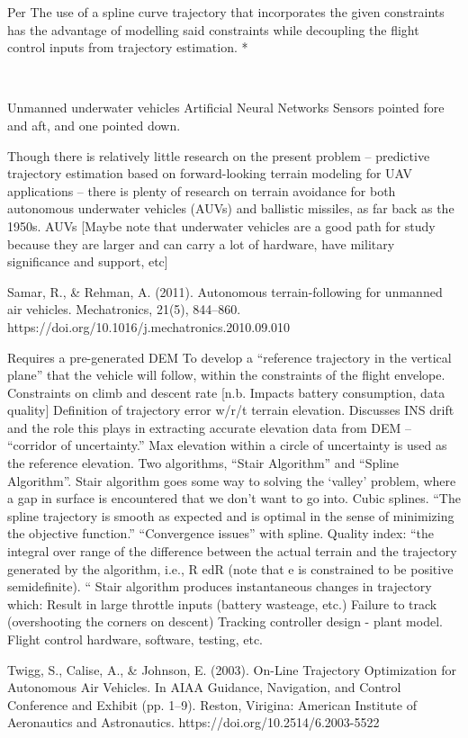 Per The use of a spline curve trajectory that incorporates the given constraints has the advantage of modelling said constraints while decoupling the flight control inputs from trajectory estimation. *


~~~

Unmanned underwater vehicles
Artificial Neural Networks
Sensors pointed fore and aft, and one pointed down.

Though there is relatively little research on the present problem -- predictive trajectory estimation based on forward-looking terrain modeling for UAV applications -- there is plenty of research on terrain avoidance for both autonomous underwater vehicles (AUVs) and ballistic missiles, as far back as the 1950s. 
AUVs
[Maybe note that underwater vehicles are a good path for study because they are larger and can carry a lot of hardware, have military significance and support, etc]

\cite{Samar2011}
Samar, R., \& Rehman, A. (2011). Autonomous terrain-following for unmanned air vehicles. Mechatronics, 21(5), 844–860. https://doi.org/10.1016/j.mechatronics.2010.09.010

Requires a pre-generated DEM
To develop a “reference trajectory in the vertical plane” that the vehicle will follow, within the constraints of the flight envelope.
Constraints on climb and descent rate [n.b. Impacts battery consumption, data quality]
Definition of trajectory error w/r/t terrain elevation.
Discusses INS drift and the role this plays in extracting accurate elevation data from DEM -- “corridor of uncertainty.”
Max elevation within a circle of uncertainty is used as the reference elevation.
Two algorithms, “Stair Algorithm” and “Spline Algorithm”.
Stair algorithm goes some way to solving the ‘valley’ problem, where a gap in surface is encountered that we don’t want to go into.
Cubic splines.
“The spline trajectory is smooth as expected and is optimal in the sense of minimizing the objective function.”
“Convergence issues” with spline.
Quality index: “the integral over range of the difference between the actual terrain and the trajectory generated by the algorithm, i.e., R edR (note that e is constrained to be positive semidefinite). “
Stair algorithm produces instantaneous changes in trajectory which:
Result in large throttle inputs (battery wasteage, etc.)
Failure to track (overshooting the corners on descent)
Tracking controller design - plant model.
Flight control hardware, software, testing, etc.

\cite{Twigg2003}
Twigg, S., Calise, A., \& Johnson, E. (2003). On-Line Trajectory Optimization for Autonomous Air Vehicles. In AIAA Guidance, Navigation, and Control Conference and Exhibit (pp. 1–9). Reston, Virigina: American Institute of Aeronautics and Astronautics. https://doi.org/10.2514/6.2003-5522

